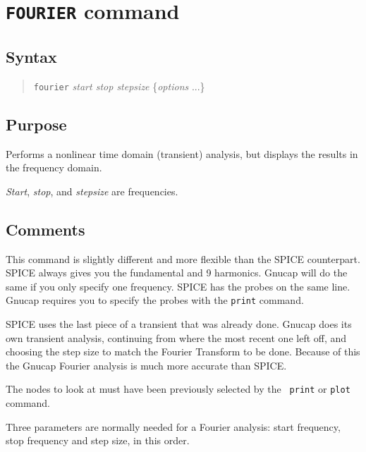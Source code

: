 \section{{\tt FOURIER} command}
\subsection{Syntax}
\begin{verse}
{\tt fourier} {\it start stop stepsize} \{{\it options} ...\}
\end{verse}
\subsection{Purpose}

Performs a nonlinear time domain (transient) analysis, but displays the
results in the frequency domain.

{\it Start}, {\it stop}, and {\it stepsize} are frequencies.
\subsection{Comments}

This command is slightly different and more flexible than the SPICE
counterpart.  SPICE always gives you the fundamental and 9 harmonics.
Gnucap will do the same if you only specify one frequency.  SPICE has
the probes on the same line.  Gnucap requires you to specify the probes
with the {\tt print} command.  

SPICE uses the last piece of a transient that was already done.  Gnucap
does its own transient analysis, continuing from where the most recent
one left off, and choosing the step size to match the Fourier
Transform to be done.  Because of this the Gnucap Fourier analysis is
much more accurate than SPICE.

The nodes to look at must have been previously selected by the {\tt
print} or {\tt plot} command.

Three parameters are normally needed for a Fourier analysis: start
frequency, stop frequency and step size, in this order.

